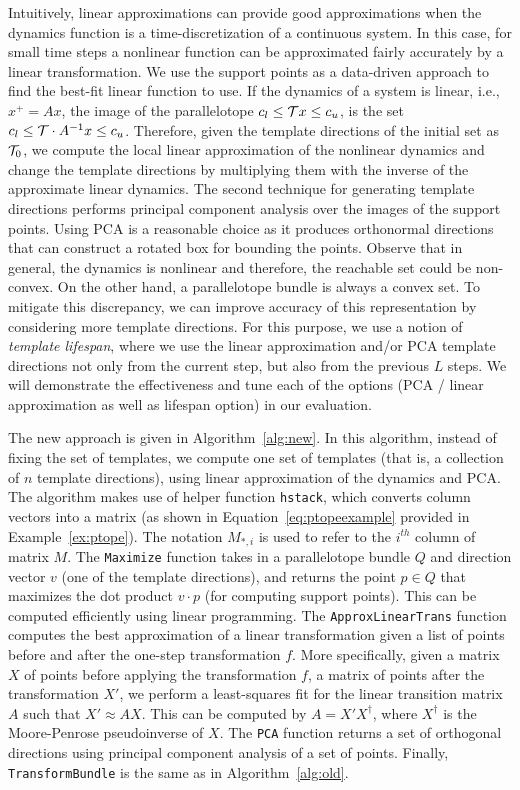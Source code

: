Intuitively, linear approximations can provide good approximations when the dynamics function is a time-discretization of a continuous system.
%
In this case, for small time steps a nonlinear function can be approximated fairly accurately by a linear transformation.
%
We use the support points as a data-driven approach to find the best-fit linear function to use.
%
If the dynamics of a system is linear, i.e., $x^{+} = Ax$, the image of the parallelotope $c_{l} \leq {\cal T} x \leq c_{u}$, is the set $c_{l} \leq {\cal T} \cdot A^{-1} x \leq c_{u}$.
%
Therefore, given the template directions of the initial set as ${\cal T}_0$, we compute the local linear approximation of the nonlinear dynamics and change the template directions by multiplying them with the inverse of the approximate linear dynamics.
%
The second technique for generating template directions performs principal component analysis over the images of the support points.
%
Using PCA is a reasonable choice as it produces orthonormal directions that can construct a rotated box for bounding the points.
%
Observe that in general, the dynamics is nonlinear and therefore, the reachable set could be non-convex.
%
On the other hand, a parallelotope bundle is always a convex set.
%
To mitigate this discrepancy, we can improve accuracy of this representation by considering more template directions.
%
For this purpose, we use a notion of \emph{template lifespan}, where we use the linear approximation and/or PCA template directions not only from the current step, but also from the previous $L$ steps.
%
We will demonstrate the effectiveness and tune each of the options (PCA / linear approximation as well as lifespan option) in our evaluation.

The new approach is given in Algorithm~\ref{alg:new}.
%
In this algorithm, instead of fixing the set of templates, we compute one set of templates (that is, a collection of $n$ template directions), using linear approximation of the dynamics and PCA.
%
The algorithm makes use of helper function \texttt{hstack}, which converts column vectors into a matrix (as shown in Equation~\ref{eq:ptopeexample} provided in Example~\ref{ex:ptope}).
%
The notation $M_{*,i}$ is used to refer to the $i^{th}$ column of matrix $M$.
%
The \texttt{Maximize} function takes in a parallelotope bundle $Q$ and direction vector $v$ (one of the template directions), and returns the point $p \in Q$ that maximizes the dot product $v \cdot p$ (for computing support points).
%
This can be computed efficiently using linear programming.
%
The \texttt{ApproxLinearTrans} function computes the best approximation of a linear transformation given a list of points before and after the one-step transformation $f$.
%
More specifically, given a matrix $X$ of points before applying the transformation $f$, a matrix of points after the transformation $X'$, we perform a least-squares fit for the linear transition matrix $A$ such that $X' \approx AX$.
%
This can be computed by $A = X' X^\dagger$, where $X^\dagger$ is the Moore-Penrose pseudoinverse of $X$.
%
The \texttt{PCA} function returns a set of orthogonal directions using principal component analysis of a set of points.
%
Finally, \texttt{TransformBundle} is the same as in Algorithm~\ref{alg:old}.

